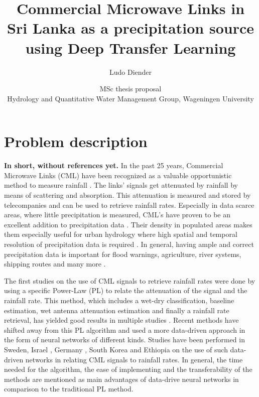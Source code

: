 \documentclass[twocolumn, 10pt, a4paper]{article}
\begin{document}
	
	\title{\vspace{-1cm}\Huge{Commercial Microwave Links in Sri Lanka as a precipitation source using Deep Transfer Learning}}
	\author{\Large{Ludo Diender}}
	\date{\normalsize{MSc thesis proposal\\
			Hydrology and Quantitative Water Management Group,
			Wageningen University}}
	
	\maketitle
	
	\section{Problem description}
	
	\textbf{In short, without references yet.}
	In the past 25 years, Commercial Microwave Links (CML) have been recognized as a valuable opportunistic method to measure rainfall \cite{Leijnse2007} \cite{Ruf1996}. The links' signals get attenuated by rainfall by means of scattering and absorption. This attenuation is measured and stored by telecompanies and can be used to retrieve rainfall rates. Especially in data scarce areas, where little precipitation is measured, CML's have proven to be an excellent addition to precipitation data \cite{Overeem2021,Doumounia2014,Diba2021}. Their density in populated areas makes them especially useful for urban hydrology where high spatial and temporal resolution of precipitation data is required \cite{Overeem2011}. In general, having ample and correct precipitation data is important for flood warnings, agriculture, river systems, shipping routes and many more \cite{Chwala2019}. 
	
	The first studies on the use of CML signals to retrieve rainfall rates were done by using a specific Power-Law (PL) to relate the attenuation of the signal and the rainfall rate. This method, which includes a wet-dry classification, baseline estimation, wet antenna attenuation estimation and finally a rainfall rate retrieval, has yielded good results in multiple studies \cite{deVos2019,Graf2020,Fencl2017}. Recent methods have shifted away from this PL algorithm and used a more data-driven approach in the form of neural networks of different kinds. Studies have been performed in Sweden, Israel \cite{Habi2019}, Germany \cite{Polz2020}, South Korea and Ethiopia \cite{Diba2021} on the use of such data-driven networks in relating CML signals to rainfall rates. In general, the time needed for the algorithm, the ease of implementing and the transferability of the methods are mentioned as main advantages of data-drive neural networks in comparison to the traditional PL method. 
	
\end{document}
